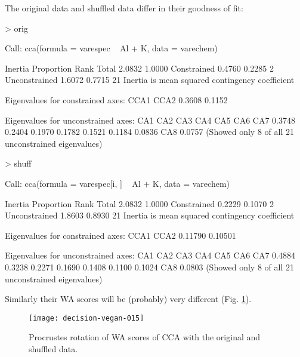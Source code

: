 \documentclass[a4paper,10pt,twocolumn]{article}
\begin{document}
The original data and shuffled data differ in their goodness of
fit:
\begin{Schunk}
\begin{Sinput}
> orig
\end{Sinput}
\begin{Soutput}
Call: cca(formula = varespec ~ Al + K, data =
varechem)

              Inertia Proportion Rank
Total          2.0832     1.0000     
Constrained    0.4760     0.2285    2
Unconstrained  1.6072     0.7715   21
Inertia is mean squared contingency coefficient 

Eigenvalues for constrained axes:
  CCA1   CCA2 
0.3608 0.1152 

Eigenvalues for unconstrained axes:
   CA1    CA2    CA3    CA4    CA5    CA6    CA7 
0.3748 0.2404 0.1970 0.1782 0.1521 0.1184 0.0836 
   CA8 
0.0757 
(Showed only 8 of all 21 unconstrained eigenvalues)
\end{Soutput}
\begin{Sinput}
> shuff
\end{Sinput}
\begin{Soutput}
Call: cca(formula = varespec[i, ] ~ Al + K, data
= varechem)

              Inertia Proportion Rank
Total          2.0832     1.0000     
Constrained    0.2229     0.1070    2
Unconstrained  1.8603     0.8930   21
Inertia is mean squared contingency coefficient 

Eigenvalues for constrained axes:
   CCA1    CCA2 
0.11790 0.10501 

Eigenvalues for unconstrained axes:
   CA1    CA2    CA3    CA4    CA5    CA6    CA7 
0.4884 0.3238 0.2271 0.1690 0.1408 0.1100 0.1024 
   CA8 
0.0803 
(Showed only 8 of all 21 unconstrained eigenvalues)
\end{Soutput}
\end{Schunk}
Similarly their WA scores will be (probably) very different
(Fig. \ref{fig:ccawa}).
\begin{figure}
\texttt{[image: decision-vegan-015]}
\caption{Procrustes rotation of WA scores of CCA with the original and
  shuffled data.}
\label{fig:ccawa}
\end{figure}
\end{document}
